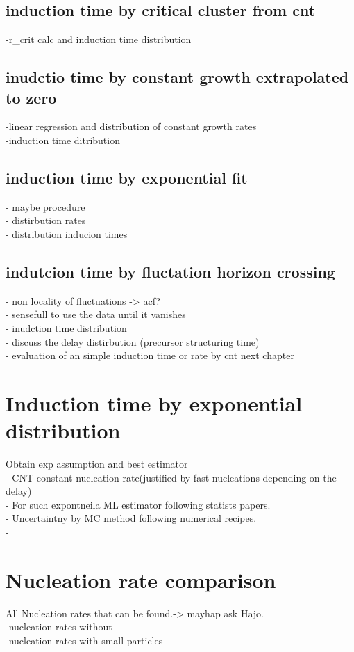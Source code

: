 \subsection{induction time by critical cluster from cnt}
-r\_crit calc and induction time distribution

\subsection{inudctio time by constant growth extrapolated to zero}
-linear regression and distribution of constant growth rates\\
-induction time ditribution

\subsection{induction time by exponential fit}
- maybe procedure\\
- distirbution rates\\
- distribution inducion times

\subsection{indutcion time by fluctation horizon crossing}
- non locality of fluctuations -> acf?\\
- sensefull to use the data until it vanishes\\
- inudction time distribution\\
- discuss the delay distirbution (precursor structuring time)\\ 
- evaluation of an simple induction time or rate by cnt next chapter


\section{Induction time by exponential distribution}
\label{sec:induction_times}
Obtain exp assumption and best estimator\\
- CNT constant nucleation rate(justified by fast nucleations depending on the delay)\\
- For such expontneila ML estimator following statists papers.\\
- Uncertaintny by MC method following numerical recipes.\\
- 

\section{Nucleation rate comparison}
\label{sec:nucleation_rates}
All Nucleation rates that can be found.-> mayhap ask Hajo.\\
-nucleation rates without\\
-nucleation rates with small particles\\


